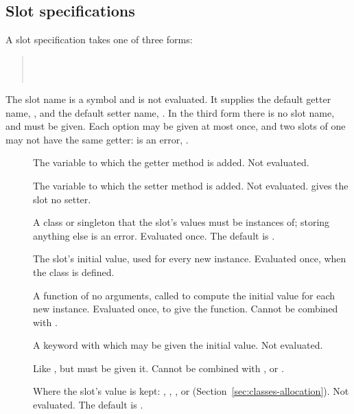 \subsection{Slot specifications}

A slot specification takes one of three forms:

\begin{quote}
\\
\\
\end{quote}

\noindent The slot name is a symbol and is not evaluated. It supplies the
default getter name, , and the default setter name,
. In the third form there is no slot name,
and  must be given. Each option may be given at most once,
and two slots of one  may not have the same getter:
 is an error,
.

\begin{description}
\item[ ] The variable to which the getter method
  is added. Not evaluated.
\item[ ] The variable to which the setter method
  is added. Not evaluated.  gives the slot no setter.
\item[ ] A class or singleton that the slot's values
  must be instances of; storing anything else is an error. Evaluated once.
  The default is .
\item[ ] The slot's initial value, used for
  every new instance. Evaluated once, when the class is defined.
\item[ ] A function of no arguments,
  called to compute the initial value for each new instance. Evaluated once,
  to give the function. Cannot be combined with .
\item[ ] A keyword with which
   may be given the initial value. Not evaluated.
\item[ ] Like
  , but  must be given it. Cannot be
  combined with ,  or
  .
\item[ ] Where the slot's value is kept:
  , , ,  or
   (Section~\ref{sec:classes-allocation}). Not evaluated. The
  default is .
\end{description}

